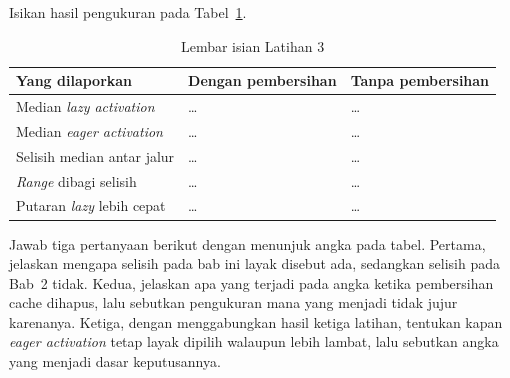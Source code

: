 Isikan hasil pengukuran pada Tabel~\ref{tab:lat3plugin-hasil}.

\begin{table}[htbp]
  \centering
  \caption{Lembar isian Latihan 3}
  \label{tab:lat3plugin-hasil}
  \begin{tabularx}{\textwidth}{|X|l|l|}
    \hline
    \textbf{Yang dilaporkan} & \textbf{Dengan pembersihan} & \textbf{Tanpa pembersihan} \\
    \hline
    Median \textit{lazy activation} & \dots & \dots \\
    \hline
    Median \textit{eager activation} & \dots & \dots \\
    \hline
    Selisih median antar jalur & \dots & \dots \\
    \hline
    \textit{Range} dibagi selisih & \dots & \dots \\
    \hline
    Putaran \textit{lazy} lebih cepat & \dots & \dots \\
    \hline
  \end{tabularx}
\end{table}

Jawab tiga pertanyaan berikut dengan menunjuk angka pada tabel. Pertama,
jelaskan mengapa selisih pada bab ini layak disebut ada, sedangkan selisih pada
Bab~2 tidak. Kedua, jelaskan apa yang terjadi pada angka ketika pembersihan
cache dihapus, lalu sebutkan pengukuran mana yang menjadi tidak jujur karenanya.
Ketiga, dengan menggabungkan hasil ketiga latihan, tentukan kapan \textit{eager activation}
tetap layak dipilih walaupun lebih lambat, lalu sebutkan angka yang menjadi
dasar keputusannya.
